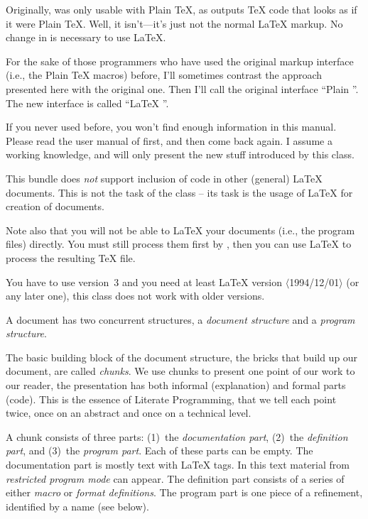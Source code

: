 Originally, \cweb{} was only usable with Plain \TeX{}, as \cweave{}
outputs \TeX{} code that looks as if it were Plain \TeX{}. Well, it
isn't---it's just not the normal \LaTeX{} markup. No change in
\cweave{} is necessary to use \LaTeX{}.

For the sake of those \cweb{} programmers who have used the original
markup interface (i.e., the Plain \TeX{} macros) before, I'll
sometimes contrast the approach presented here with the original one.
Then I'll call the original interface ``Plain \cweb{}''. The new
interface is called ``\LaTeX{} \cweb{}''.

If you never used \cweb{} before, you won't find enough information in
this manual. Please read the user manual of \cweb{} first, and then
come back again. I assume a working knowledge, and will only present
the new stuff introduced by this class.


\sect This bundle does \emph{not} support inclusion of \cweb{} code in
other (general) \LaTeX{} documents. This is not the task of the
 class -- its task is the usage of \LaTeX{} for creation of
\cweb{} documents.

Note also that you will not be able to \LaTeX{} your \cweb{} documents
(i.e., the program files) directly. You must still process them first
by \cweave{}, then you can use \LaTeX{} to process the resulting
\TeX{} file.


\sect You have to use \cweb{} version~3 and you need at least \LaTeX{}
version \mbox{$\langle$1994/12/01$\rangle$} (or any later one), this
class does not work with older versions.


\sect A \cweb{} document has two concurrent structures, a
\textsl{document structure} and a \textsl{program structure}.

The basic building block of the document structure, the bricks that
build up our document, are called \textsl{chunks}. We use chunks to
present one point of our work to our reader, the presentation has both
informal (explanation) and formal parts (code). This is the essence of
Literate Programming, that we tell each point twice, once on an
abstract and once on a technical level.

A chunk consists of three parts: (1)~the \textsl{documentation part},
(2)~the \textsl{definition part}, and (3)~the \textsl{program part}.
Each of these parts can be empty. The documentation part is mostly
text with \LaTeX{} tags. In this text material from \textsl{restricted
program mode} can appear. The definition part consists of a series of
either \textsl{macro} or \textsl{format definitions}. The program part
is one piece of a refinement, identified by a name (see below).

